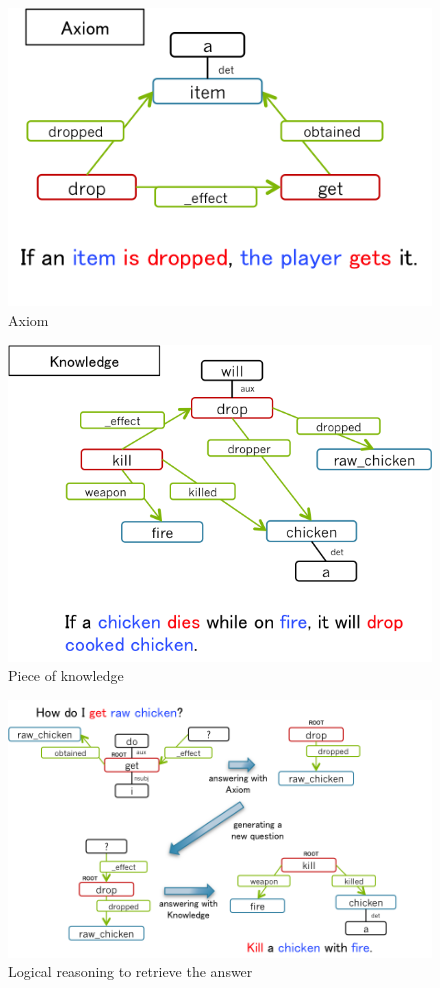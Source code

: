 \documentclass[12pt]{article}
\begin{document}
\begin{figure}[!htbp]
   \centering \includegraphics[width=0.6\linewidth]{Figures/Question_Answering/axiom.png}
   \caption{\label{axiomEx} Axiom}
\end{figure}

\begin{figure}[!htbp]
   \centering \includegraphics[width=0.6\linewidth]{Figures/Question_Answering/knowledge.png}
   \caption{\label{knowledgeEx} Piece of knowledge}
\end{figure}

\begin{figure}[!htbp]
   \centering \includegraphics[width=0.9\linewidth]{Figures/Question_Answering/answer.png}
   \caption{\label{answerEx} Logical reasoning to retrieve the answer}
\end{figure}
\end{document}
